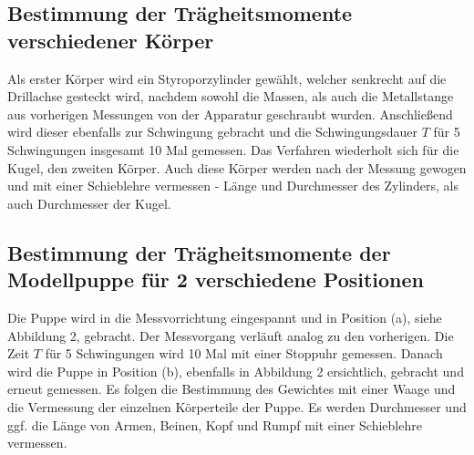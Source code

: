 \subsection{Bestimmung der Trägheitsmomente verschiedener Körper}

Als erster Körper wird ein Styroporzylinder gewählt, welcher senkrecht auf die Drillachse gesteckt wird, nachdem sowohl die Massen, als auch die Metallstange aus vorherigen Messungen von der Apparatur geschraubt wurden. Anschließend wird dieser ebenfalls zur Schwingung gebracht und die Schwingungsdauer $T$ für 5 Schwingungen insgesamt 10 Mal gemessen. Das Verfahren wiederholt sich für die Kugel, den zweiten Körper. Auch diese Körper werden nach der Messung gewogen und mit einer Schieblehre vermessen - Länge und Durchmesser des Zylinders, als auch Durchmesser der Kugel. 

\subsection{Bestimmung der Trägheitsmomente der Modellpuppe für 2 verschiedene Positionen}

Die Puppe wird in die Messvorrichtung eingespannt und in Position (a), siehe Abbildung 2, gebracht. Der Messvorgang verläuft analog zu den vorherigen. Die Zeit $T$ für 5 Schwingungen wird 10 Mal mit einer Stoppuhr gemessen. Danach wird die Puppe in Position (b), ebenfalls in Abbildung 2 ersichtlich, gebracht und erneut gemessen. Es folgen die Bestimmung des Gewichtes mit einer Waage und die Vermessung der einzelnen Körperteile der Puppe. Es werden Durchmesser und ggf. die Länge von Armen, Beinen, Kopf und Rumpf mit einer Schieblehre vermessen.

